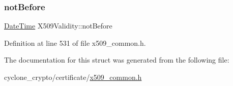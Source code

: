 \subsubsection{\texorpdfstring{not\+Before}{notBefore}}
{\footnotesize\ttfamily \hyperlink{structDateTime}{Date\+Time} X509\+Validity\+::not\+Before}



Definition at line 531 of file x509\+\_\+common.\+h.



The documentation for this struct was generated from the following file\+:\begin{DoxyCompactItemize}
\item 
cyclone\+\_\+crypto/certificate/\hyperlink{certificate_2x509__common_8h}{x509\+\_\+common.\+h}\end{DoxyCompactItemize}
